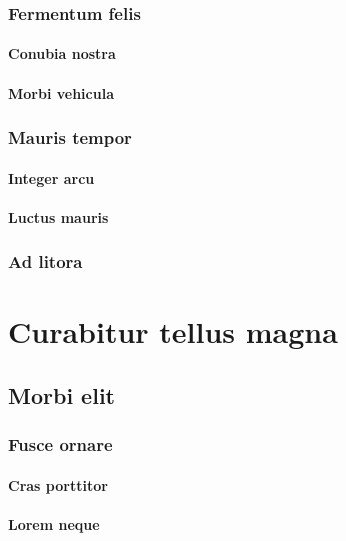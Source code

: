 \subsection{Fermentum felis} \lipsum[15]
\subsubsection{Conubia nostra} \lipsum[16]
\subsubsection{Morbi vehicula} \lipsum[17]

\subsection{Mauris tempor} \lipsum [18]
\subsubsection{Integer arcu} \lipsum[19]
\subsubsection{Luctus mauris} \lipsum[20]
\subsection{Ad litora} \lipsum [21-22]



\chapter{Curabitur tellus magna}

 \lipsum[1-2]

\section{Morbi elit} \lipsum[3-4]
\subsection{Fusce ornare} \lipsum[5]
\subsubsection{Cras porttitor} \lipsum[6]
\subsubsection{Lorem neque} \lipsum[7]
